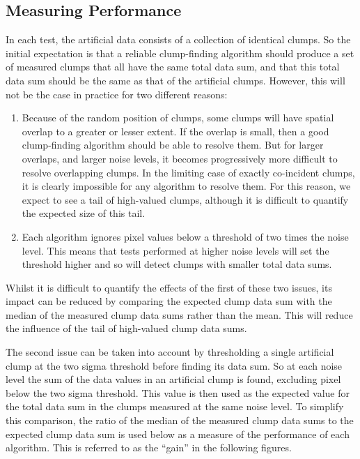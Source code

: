 \documentclass[final,authoryear,5p,times,twocolumn]{elsarticle}
\begin{document}
\subsection{Measuring Performance}
In each test, the artificial data consists of a collection of identical
clumps. So the initial expectation is that a reliable clump-finding
algorithm should produce a set of measured clumps that all have the same
total data sum, and that this total data sum should be the same as that
of the artificial clumps. However, this will not be the case in practice
for two different reasons:

\begin{enumerate}

\item Because of the random position of clumps, some clumps will have
spatial overlap to a greater or lesser extent. If the overlap is small,
then a good clump-finding algorithm should be able to resolve them. But
for larger overlaps, and larger noise levels, it becomes progressively
more difficult to resolve overlapping clumps. In the limiting case of
exactly co-incident clumps, it is clearly impossible for any algorithm
to resolve them. For this reason, we expect to see a tail of high-valued
clumps, although it is difficult to quantify the expected size of this
tail.

\item Each algorithm ignores pixel values below a threshold of two times the
noise level. This means that tests performed at higher noise levels will
set the threshold higher and so will detect clumps with smaller total
data sums.

\end{enumerate}

Whilst it is difficult to quantify the effects of the first of these two
issues, its impact can be reduced by comparing the expected clump data
sum with the median of the measured clump data sums rather than the mean.
This will reduce the influence of the tail of high-valued clump data sums.

The second issue can be taken into account by thresholding a single artificial
clump at the two sigma threshold before finding its data sum. So at each
noise level the sum of the data values in an artificial clump is found,
excluding pixel below the two sigma threshold. This value is then used as
the expected value for the total data sum in the clumps measured at the
same noise level. To simplify this comparison, the ratio of the median of
the measured clump data sums to the expected clump data sum is used below
as a measure of the performance of each algorithm. This is referred to as
the ``gain'' in the following figures.
\end{document}
